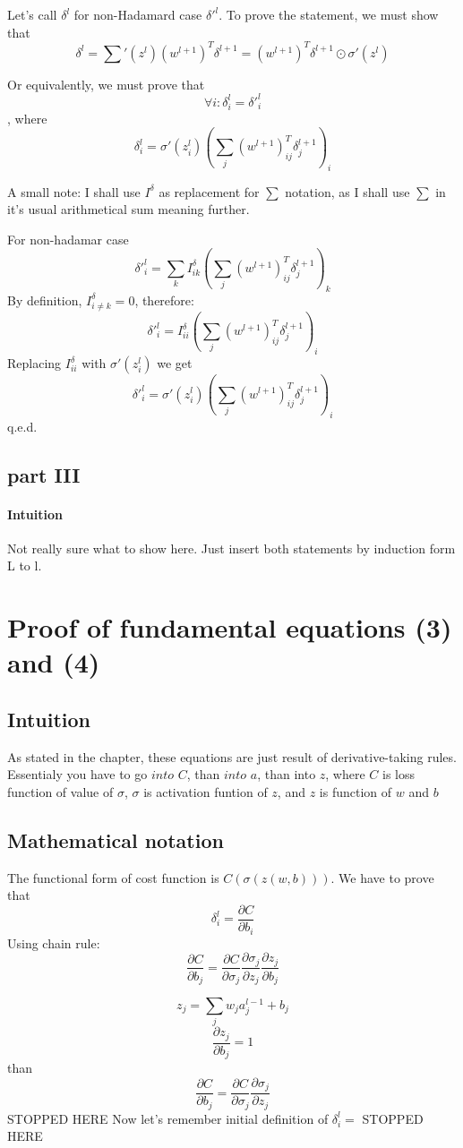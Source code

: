 \documentclass{article}
\begin{document}
Let's call $\delta^l$ for non-Hadamard case $\delta'^l$.
To prove the statement, we must show that 
$$\delta^l = {\sum}'(z^l) (w^{l+1})^{T} \delta^{l+1} = (w^{l+1})^{T} \delta^{l+1}\odot\sigma'(z^l)$$

Or equivalently, we must prove that $$\forall i: \delta^l_i = \delta'^l_i$$, where 
$$\delta^l_i = \sigma'(z_i^l) (\sum_j(w^{l+1})^T_{ij} \delta^{l+1}_j)_i$$

A small note: I shall use $I^{\delta}$ as replacement for $\sum$ notation, as I shall use $\sum$ in it's usual arithmetical sum meaning further.

For non-hadamar case
$$\delta'^l_i = \sum_k I^{\delta}_{ik} (\sum_j(w^{l+1})^T_{ij} \delta^{l+1}_j)_k$$
By definition, $I^{\delta}_{i \neq k} = 0$, therefore:
$$\delta'^l_i = I^{\delta}_{ii} (\sum_j(w^{l+1})^T_{ij} \delta^{l+1}_j)_i$$
Replacing $I^{\delta}_{ii}$ with $\sigma'(z_i^l)$ we get 
$$\delta'^l_i = \sigma'(z_i^l) (\sum_j(w^{l+1})^T_{ij} \delta^{l+1}_j)_i$$
q.e.d.

\subsection{part III}
\paragraph{Intuition}
Not really sure what to show here. Just insert both statements by induction form L to l.


\section{Proof of fundamental equations (3) and (4)}
\subsection{Intuition}
As stated in the chapter, these equations are just result of derivative-taking rules.
Essentialy you have to go $into$ $C$, than $into$ $a$, than into $z$, where $C$ is loss function of value of $\sigma$, $\sigma$ is activation funtion of $z$, and $z$ is function of $w$ and $b$
\subsection{Mathematical notation}
The functional form of cost function is $C(\sigma(z(w,b)))$.
We have to prove that 
$$\delta^l_i = \frac{\partial C}{\partial b_i}$$
Using chain rule:
$$\frac{\partial C}{\partial b_j} = \frac{\partial C}{\partial \sigma_j} \frac{\partial \sigma_j}{\partial z_j} \frac{\partial z_j}{\partial b_j}$$



$$z_j = \sum_jw_ja_j^{l-1} + b_j$$
$$\frac{\partial z_j}{\partial b_j} = 1$$
than 
$$\frac{\partial C}{\partial b_j} = \frac{\partial C}{\partial \sigma_j} \frac{\partial \sigma_j}{\partial z_j}$$
STOPPED HERE
Now let's remember initial definition of $\delta^l_i = $
STOPPED HERE
\end{document}
